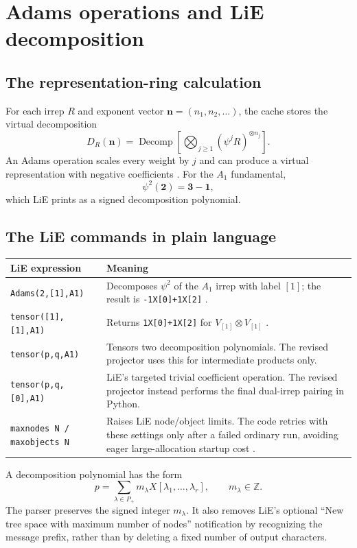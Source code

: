 \documentclass[11pt,a4paper]{article}
\newcommand{\code}[1]{{\small\nolinkurl{#1}}}
\begin{document}
\newcommand{\sessionheading}{\subsection}



\clearpage
\section{Adams operations and LiE decomposition}\label{sec:adams}
\subsection{The representation-ring calculation}
For each irrep $R$ and exponent vector $\mathbf n=(n_1,n_2,\ldots)$, the cache
stores the virtual decomposition
\begin{equation}
 D_R(\mathbf n)=\operatorname{Decomp}\left[\bigotimes_{j\geq1}
 (\psi^jR)^{\otimes n_j}\right].
\end{equation}
An Adams operation scales every weight by $j$ and can produce a virtual
representation with negative coefficients \cite[Secs.~3.4, 4.5]{lie}. For the
$A_1$ fundamental,
\begin{equation}
 \psi^2(\mathbf2)=\mathbf3-\mathbf1,
\end{equation}
which LiE prints as a signed decomposition polynomial.

\subsection{The LiE commands in plain language}
\begin{tabularx}{\textwidth}{@{}p{57mm}Y@{}}
\toprule LiE expression & Meaning\\\midrule
\code{Adams(2,[1],A1)} & Decomposes $\psi^2$ of the $A_1$ irrep with label
$[1]$; the result is \code{-1X[0]+1X[2]} \cite[Sec.~4.5]{lie}.\\
\code{tensor([1],[1],A1)} & Returns \code{1X[0]+1X[2]} for
$V_{[1]}\otimes V_{[1]}$ \cite[Sec.~4.5]{lie}.\\
\code{tensor(p,q,A1)} & Tensors two decomposition polynomials. The revised
projector uses this for intermediate products only.\\
\code{tensor(p,q,[0],A1)} & LiE's targeted trivial coefficient operation.
The revised projector instead performs the final dual-irrep pairing in Python.\\
\code{maxnodes N / maxobjects N} & Raises LiE node/object limits. The code
retries with these settings only after a failed ordinary run, avoiding eager
large-allocation startup cost \cite[Sec.~2.3]{lie}.\\\bottomrule
\end{tabularx}
A decomposition polynomial has the form
\begin{equation}
 p=\sum_{\lambda\in P_+}m_\lambda X[\lambda_1,\ldots,\lambda_r],\qquad m_\lambda\in\mathbb Z.
\end{equation}
The parser preserves the signed integer $m_\lambda$. It also removes LiE's
optional ``New tree space with maximum number of nodes'' notification by
recognizing the message prefix, rather than by deleting a fixed number of output characters.
\end{document}
